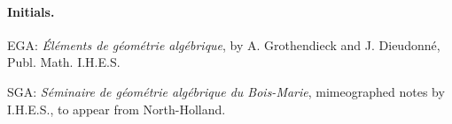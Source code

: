 \documentclass[10pt]{article}
\begin{document}
\newpage
\paragraph{Initials.}
EGA: \emph{Éléments de géométrie algébrique}, by A. Grothendieck and J. Dieudonné, Publ. Math. I.H.E.S.

SGA: \emph{Séminaire de géométrie algébrique du Bois-Marie}, mimeographed notes by I.H.E.S., to appear from North-Holland.
\end{document}
